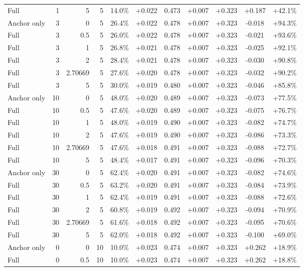 \begin{table}[htbp]
\begin{tabular}{lrrrccccccc}
Full & 1 & 5 & 5 & 14.0\% & +0.022 & 0.473 & +0.007 & +0.323 & +0.187 & +42.1\% \\
Anchor only & 3 & 0 & 5 & 26.4\% & +0.022 & 0.478 & +0.007 & +0.323 & -0.018 & +94.3\% \\
Full & 3 & 0.5 & 5 & 26.0\% & +0.022 & 0.478 & +0.007 & +0.323 & -0.021 & +93.6\% \\
Full & 3 & 1 & 5 & 26.8\% & +0.021 & 0.478 & +0.007 & +0.323 & -0.025 & +92.1\% \\
Full & 3 & 2 & 5 & 28.4\% & +0.021 & 0.478 & +0.007 & +0.323 & -0.030 & +90.8\% \\
Full & 3 & 2.70669 & 5 & 27.6\% & +0.020 & 0.478 & +0.007 & +0.323 & -0.032 & +90.2\% \\
Full & 3 & 5 & 5 & 30.0\% & +0.019 & 0.480 & +0.007 & +0.323 & -0.046 & +85.8\% \\
Anchor only & 10 & 0 & 5 & 48.0\% & +0.020 & 0.489 & +0.007 & +0.323 & -0.073 & +77.5\% \\
Full & 10 & 0.5 & 5 & 47.6\% & +0.020 & 0.489 & +0.007 & +0.323 & -0.075 & +76.7\% \\
Full & 10 & 1 & 5 & 48.0\% & +0.019 & 0.490 & +0.007 & +0.323 & -0.082 & +74.7\% \\
Full & 10 & 2 & 5 & 47.6\% & +0.019 & 0.490 & +0.007 & +0.323 & -0.086 & +73.3\% \\
Full & 10 & 2.70669 & 5 & 47.6\% & +0.018 & 0.491 & +0.007 & +0.323 & -0.088 & +72.7\% \\
Full & 10 & 5 & 5 & 48.4\% & +0.017 & 0.491 & +0.007 & +0.323 & -0.096 & +70.3\% \\
Anchor only & 30 & 0 & 5 & 62.4\% & +0.020 & 0.491 & +0.007 & +0.323 & -0.082 & +74.6\% \\
Full & 30 & 0.5 & 5 & 63.2\% & +0.020 & 0.491 & +0.007 & +0.323 & -0.084 & +73.9\% \\
Full & 30 & 1 & 5 & 62.4\% & +0.019 & 0.491 & +0.007 & +0.323 & -0.088 & +72.6\% \\
Full & 30 & 2 & 5 & 60.8\% & +0.019 & 0.492 & +0.007 & +0.323 & -0.094 & +70.9\% \\
Full & 30 & 2.70669 & 5 & 61.6\% & +0.018 & 0.492 & +0.007 & +0.323 & -0.095 & +70.6\% \\
Full & 30 & 5 & 5 & 62.0\% & +0.018 & 0.492 & +0.007 & +0.323 & -0.100 & +69.0\% \\
Anchor only & 0 & 0 & 10 & 10.0\% & +0.023 & 0.474 & +0.007 & +0.323 & +0.262 & +18.9\% \\
Full & 0 & 0.5 & 10 & 10.0\% & +0.023 & 0.474 & +0.007 & +0.323 & +0.262 & +18.8\% \\

\end{tabular}
\end{table}
